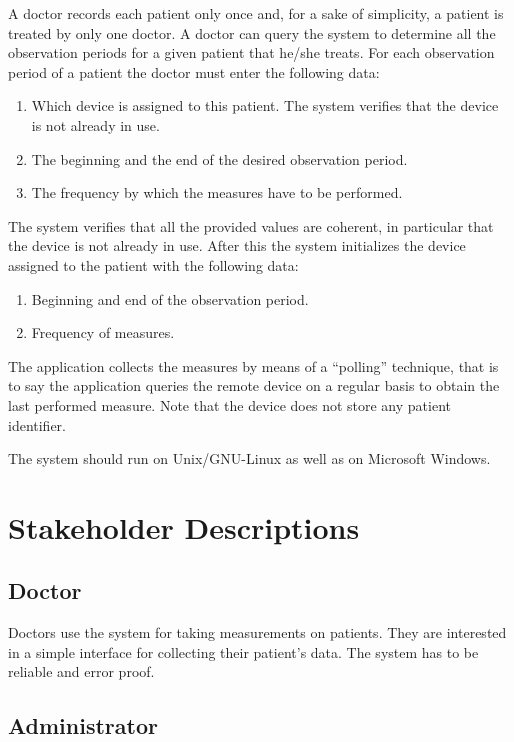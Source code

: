 \documentclass[fontsize=12pt,
               paper=a4,
               twoside=false,
               parskip=half,
               ]{scrartcl}
\begin{document}
A doctor records each patient only once and, for a sake of simplicity, a patient is treated by only one doctor. A doctor can query the system to determine all the observation periods for a given patient that he/she treats.
For each observation period of a patient the doctor must enter the following data:

\begin{enumerate}
\item Which device is assigned to this patient. The system verifies that the device is not already in use.
\item The beginning and the end of the desired observation period.
\item The frequency by which the measures have to be performed.
\end{enumerate}

The system verifies that all the provided values are coherent, in particular that the device is not already in use.
After this the system initializes the device assigned to the patient with the following data:

\begin{enumerate}
\item Beginning and end of the observation period.
\item Frequency of measures.
\end{enumerate}

The application collects the measures by means of a \enquote{polling} technique, that is to say the application queries the remote device on a regular basis to obtain the last performed measure. Note that the device does not store any patient identifier.

The system should run on Unix/GNU-Linux as well as on Microsoft Windows.

\section{Stakeholder Descriptions}

\subsection{Doctor}

Doctors use the system for taking measurements on patients. They are interested in a simple interface for collecting their patient's data. The system has to be reliable and error proof.

\subsection{Administrator}
\end{document}
